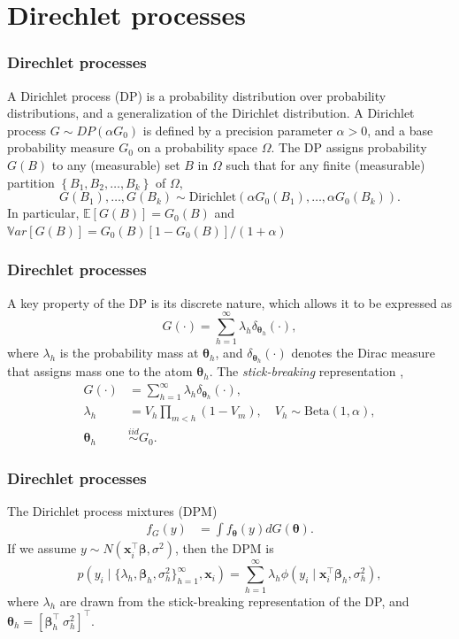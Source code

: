 \documentclass[12pt, compress]{beamer}
\begin{document}
\section{Direchlet processes}

\begin{frame}
	\frametitle{Direchlet processes}
A Dirichlet process (DP) is a probability distribution over probability distributions, and a generalization of the Dirichlet distribution.
A Dirichlet process $G\sim DP(\alpha G_0)$ is defined by a precision parameter $\alpha>0$, and a base probability measure $G_0$ on a probability space $\Omega$.
The DP assigns probability $G(B)$ to any (measurable) set $B$ in $\Omega$ such that for any finite (measurable) partition $\left\{B_1, B_2, \dots, B_k\right\}$ of $\Omega$,  
\[
G(B_1),\dots, G(B_k) \sim \text{Dirichlet}(\alpha G_0(B_1), \dots, \alpha G_0(B_k)).
\]
In particular, $\mathbb{E}\left[G(B)\right]=G_0(B)$ and $\mathbb{V}ar\left[G(B)\right]=G_0(B)\left[1-G_0(B)\right]/(1+\alpha)$
\end{frame}


\begin{frame}
	\frametitle{Direchlet processes}
A key property of the DP is its discrete nature, which allows it to be expressed as  
\[
G(\cdot)=\sum_{h=1}^{\infty}\lambda_h\delta_{\boldsymbol{\theta}_h}(\cdot),
\]
where $\lambda_h$ is the probability mass at $\boldsymbol{\theta}_h$, and $\delta_{\boldsymbol{\theta}_h}(\cdot)$ denotes the Dirac measure that assigns mass one to the atom $\boldsymbol{\theta}_h$.
The \textit{stick-breaking} representation \citep{Sethuraman1994},
\begin{align*}
G(\cdot)&=\sum_{h=1}^{\infty}\lambda_h\delta_{\boldsymbol{\theta}_h}(\cdot),\\
	\lambda_h&=V_h\prod_{m<h}(1-V_m), \quad V_h\sim \text{Beta}(1,\alpha),\\
	\boldsymbol{\theta}_h&\stackrel{iid}{\sim} G_0.
\end{align*}  
\end{frame}

\begin{frame}
	\frametitle{Direchlet processes}
The Dirichlet process mixtures (DPM)
\begin{align*}
	f_G(y) &= \int f_{\boldsymbol{\theta}}(y) dG(\boldsymbol{\theta}).
\end{align*}
If we assume $y\sim N(\boldsymbol{x}_i^{\top}\boldsymbol{\beta},\sigma^2)$, then the DPM is 
\[
p(y_i \mid \{\lambda_h, \boldsymbol{\beta}_h, \sigma_h^2\}_{h=1}^{\infty}, \boldsymbol{x}_i) = 
\sum_{h=1}^{\infty} \lambda_h \phi(y_i \mid \boldsymbol{x}_i^{\top}\boldsymbol{\beta}_h, \sigma_h^2),
\]
where $\lambda_h$ are drawn from the stick-breaking representation of the DP, and $\boldsymbol{\theta}_h=[\boldsymbol{\beta}_h^{\top} \ \sigma^2_h]^{\top}$.
\end{frame}
\end{document}
